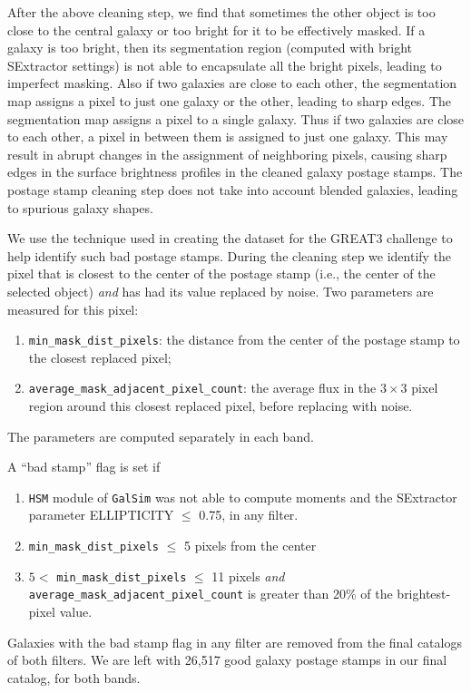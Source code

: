 \documentclass[a4paper,11pt]{article}
\begin{document}
After the above cleaning step, we find that sometimes the other object is too close to the central galaxy or too bright for it to be effectively masked.
If a galaxy is too bright, then its segmentation region (computed with bright SExtractor settings)  is not able to encapsulate all the bright pixels, leading to imperfect masking. Also  if two galaxies are close to each other, the segmentation map assigns a pixel to just one galaxy or the other, leading to sharp edges. The segmentation map assigns a pixel to a single galaxy. Thus if two galaxies are close to each other, a pixel in between them  is assigned to just one galaxy. This may result in abrupt changes in the assignment of neighboring pixels, causing sharp edges in the surface brightness profiles in the cleaned galaxy postage stamps. The postage stamp cleaning step  does not take into account blended galaxies, leading to spurious galaxy shapes. 

We use the technique used in creating the dataset for the GREAT3 challenge \citep{Mandelbaum2014} to help identify such bad postage stamps.
During the cleaning step we identify the pixel that is closest to the center of the postage stamp (i.e., the center of the selected object) {\em and} has had its value replaced by noise. 
Two parameters are measured for this pixel:
\begin{enumerate}
\item  {\tt min\_mask\_dist\_pixels}: the distance from the center of the postage stamp to the closest replaced pixel;
\item {\tt average\_mask\_adjacent\_pixel\_count}: the average flux in the $3 \times 3$ pixel region around this closest replaced pixel, before replacing with noise.
\end{enumerate}
The parameters are computed separately in each band. 

A ``bad stamp'' flag is set if
\begin{enumerate}
\item {\tt HSM} module of {\tt GalSim} was not able to compute moments and the SExtractor parameter ELLIPTICITY $\leq $ 0.75, in any filter.
\item {\tt min\_mask\_dist\_pixels} $\leq $ 5 pixels from the center
\item $5<$ {\tt min\_mask\_dist\_pixels} $\leq $ 11 pixels {\em and} {\tt average\_mask\_adjacent\_pixel\_count} is greater than 20\% of the brightest-pixel value.
\end{enumerate}
Galaxies with the bad stamp flag in any filter are removed from the final catalogs of both filters.
We are left with 26,517 good galaxy postage stamps in our final catalog, for both bands.
\end{document}
